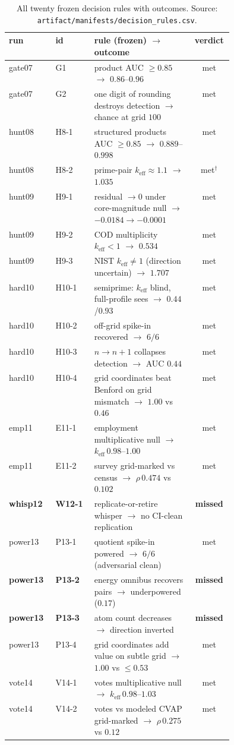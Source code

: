 \documentclass[12pt]{article}
\newcommand{\keff}{k_{\mathrm{eff}}}
\newcommand{\rmass}{\rho}
\begin{document}
\begin{table}[t]
\centering
\caption{All twenty frozen decision rules with outcomes. Source:
\texttt{artifact/manifests/decision\_rules.csv}.}
\label{tab:prereg}
\scriptsize
\begin{tabular}{llp{0.44\linewidth}c}
\toprule
run & id & rule (frozen) $\to$ outcome & verdict \\
\midrule
gate07  & G1 & product AUC $\ge0.85$ $\to$ $0.86$--$0.96$ & met \\
gate07  & G2 & one digit of rounding destroys detection $\to$ chance at grid $100$ & met \\
hunt08  & H8-1 & structured products AUC $\ge0.85$ $\to$ $0.889$--$0.998$ & met \\
hunt08  & H8-2 & prime-pair $\keff\approx1.1$ $\to$ $1.035$ & met$^{\dagger}$ \\
hunt09  & H9-1 & residual $\to0$ under core-magnitude null $\to$ $-0.0184{\to}{-}0.0001$ & met \\
hunt09  & H9-2 & COD multiplicity $\keff<1$ $\to$ $0.534$ & met \\
hunt09  & H9-3 & NIST $\keff\ne1$ (direction uncertain) $\to$ $1.707$ & met \\
hard10  & H10-1 & semiprime: $\keff$ blind, full-profile sees $\to$ $0.44$/$0.93$ & met \\
hard10  & H10-2 & off-grid spike-in recovered $\to$ $6/6$ & met \\
hard10  & H10-3 & $n{\to}n{+}1$ collapses detection $\to$ AUC $0.44$ & met \\
hard10  & H10-4 & grid coordinates beat Benford on grid mismatch $\to$ $1.00$ vs $0.46$ & met \\
emp11   & E11-1 & employment multiplicative null $\to$ $\keff\,0.98$--$1.00$ & met \\
emp11   & E11-2 & survey grid-marked vs census $\to$ $\rmass\,0.474$ vs $0.102$ & met \\
\textbf{whisp12} & \textbf{W12-1} & replicate-or-retire whisper $\to$ no CI-clean replication & \textbf{missed} \\
power13 & P13-1 & quotient spike-in powered $\to$ $6/6$ (adversarial clean) & met \\
\textbf{power13} & \textbf{P13-2} & energy omnibus recovers pairs $\to$ underpowered ($0.17$) & \textbf{missed} \\
\textbf{power13} & \textbf{P13-3} & atom count decreases $\to$ direction inverted & \textbf{missed} \\
power13 & P13-4 & grid coordinates add value on subtle grid $\to$ $1.00$ vs $\le0.53$ & met \\
vote14  & V14-1 & votes multiplicative null $\to$ $\keff\,0.98$--$1.03$ & met \\
vote14  & V14-2 & votes vs modeled CVAP grid-marked $\to$ $\rmass\,0.275$ vs $0.12$ & met \\
\bottomrule
\end{tabular}


\end{table}
\end{document}
